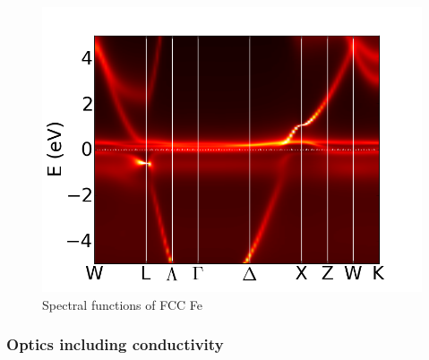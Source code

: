 \documentclass[12 pt]{article}
\begin{document}
  \begin{figure}[ht]
    \centering
    \caption{Spectral functions of FCC Fe}
    \label{Spectral functions of FCC Fe}
    \vspace{2ex}
    \includegraphics[scale=0.43]{FCC_FeBandStructure}
  \end{figure}

  \cleardoublepage

      \subsubsection{Optics including conductivity}
\end{document}
